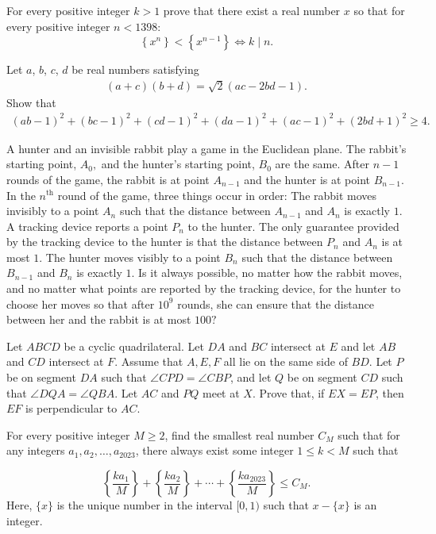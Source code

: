 \documentclass[11pt]{scrartcl}
\begin{document}
\begin{problem}[3252198251786492989]
For every positive integer $k>1$ prove that there exist a real number $x$ so that for every positive integer $n<1398$:
$$\left\{x^n\right\}<\left\{x^{n-1}\right\} \Longleftrightarrow k\mid n.$$
\end{problem}
\begin{problem}[3311837168460713142]
Let $a$, $b$, $c$, $d$ be real numbers satisfying
\begin{align*}
(a + c)(b + d) = \sqrt{2}(ac - 2bd - 1). 
\end{align*}Show that
\begin{align*}
(ab - 1)^2 + (bc - 1)^2 + (cd - 1)^2 + (da - 1)^2 + (ac - 1)^2 + (2bd + 1)^2 \ge 4. 
\end{align*}
\end{problem}
\begin{problem}[3333337471825030029]
A hunter and an invisible rabbit play a game in the Euclidean plane. The rabbit's starting point, $A_0,$ and the hunter's starting point, $B_0$ are the same. After $n-1$ rounds of the game, the rabbit is at point $A_{n-1}$ and the hunter is at point $B_{n-1}.$ In the $n^{\text{th}}$ round of the game, three things occur in order:
The rabbit moves invisibly to a point $A_n$ such that the distance between $A_{n-1}$ and $A_n$ is exactly $1.$
A tracking device reports a point $P_n$ to the hunter. The only guarantee provided by the tracking device to the hunter is that the distance between $P_n$ and $A_n$ is at most $1.$
The hunter moves visibly to a point $B_n$ such that the distance between $B_{n-1}$ and $B_n$ is exactly $1.$
Is it always possible, no matter how the rabbit moves, and no matter what points are reported by the tracking device, for the hunter to choose her moves so that after $10^9$ rounds, she can ensure that the distance between her and the rabbit is at most $100?$
\end{problem}
\begin{problem}[3353450172272500341]
Let $ABCD$ be a cyclic quadrilateral. Let $DA$ and $BC$ intersect at $E$ and let $AB$ and $CD$
intersect at $F$. Assume that $A, E, F$ all lie on the same side of $BD$. Let $P$ be on segment $DA$
such that $\angle CPD = \angle CBP$, and let $Q$ be on segment $CD$ such that $\angle DQA = \angle QBA$. Let $AC$ and $PQ$ meet at $X$. Prove that, if $EX = EP$, then $EF$ is perpendicular to $AC$.
\end{problem}
\begin{problem}[3386683349955795885]
For every positive integer $M \geq  2$, find the smallest real number $C_M$ such that for any integers $a_1, a_2,\ldots , a_{2023}$, there always exist some integer $1 \leq k < M$ such that

\[\left\{\frac{ka_1}{M}\right\}+\left\{\frac{ka_2}{M}\right\}+\cdots+\left\{\frac{ka_{2023}}{M}\right\}\leq C_M.\]Here, $\{x\}$ is the unique number in the interval $[0, 1)$ such that $x - \{x\}$ is an integer.
\end{problem}
\end{document}
